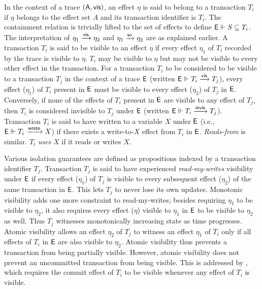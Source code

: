 In the context of a trace $(\textsf{A},\textsf{vis})$, an effect $\eta$ is said to
belong to a transaction $T_i$ if $\eta$ belongs to the effect set $A$
and its transaction identifier is $T_i$. The containment relation is
trivially lifted to the set of effects to define $\textsf{E} \Vdash S \subseteq
  T_i$.  The interpretation of $\eta_1 \xrightarrow{\textsf{vis}} \eta_2$ and $\eta_1
\xrightarrow{\textsf{so}} \eta_2$ are as explained earlier.  A transaction $T_i$ is said
to be visible to an effect $\eta$ if every effect $\eta_1$ of $T_i$
recorded by the trace is visible to $\eta$.  $T_i$ may be visible to
$\eta$ but may not be visible to every other effect in the
transaction. For a transaction $T_i$ to be considered to be visible to
a transaction $T_j$ in the context of a trace $\textsf{E}$ (written
$\textsf{E} \Vdash T_i \xrightarrow{\textsf{vis}} T_j$), every effect ($\eta_1$) of $T_i$ present
in $\textsf{E}$ must be visible to every effect ($\eta_2$) of $T_j$ in
$\textsf{E}$. Conversely, if none of the effects of $T_i$ present in $\textsf{E}$ are
visible to any effect of $T_j$, then $T_i$ is considered invisible to
$T_j$ under $\textsf{E}$ (written $\textsf{E} \Vdash T_i \xrightarrow{\textsf{invis}} T_j$). Transaction
$T_i$ is said to have written to a variable $X$ under $\textsf{E}$ (i.e.,
$\textsf{E} \Vdash T_i \xrightarrow{\textsf{wrsto}} X$) if there exists a write-to-$X$ effect from
$T_i$ in $\textsf{E}$. \emph{Reads-from} is similar. $T_i$ \emph{uses} $X$ if
it reads or writes $X$.

Various isolation guarantees are defined as propositions indexed by
a transaction identifier $T_j$. Transaction $T_j$ is said to have
experienced \emph{read-my-writes} visibility under $\textsf{E}$ if every
effect ($\eta_1$) of $T_j$ is visible to every subsequent effect
($\eta_2$) of the same transaction in $\textsf{E}$. This lets $T_j$ to never
lose its own updates. Monotonic visibility adds one more constraint to
read-my-writes; besides requiring $\eta_1$ to be visible to $\eta_2$,
it also requires every effect ($\eta$) visible to $\eta_1$ in $\textsf{E}$ to
be visible to $\eta_2$ as well. Thus $T_j$ witnesses monotonically
increasing state as time progresses. Atomic visibility allows an
effect $\eta_2$ of $T_j$ to witness an effect $\eta_1$ of $T_i$ only
if all effects of $T_i$ in $\textsf{E}$ are also visible to $\eta_2$. Atomic
visibility thus prevents a transaction from being partially visible.
However, atomic visibility does not prevent an uncommitted
transaction from being visible. This is addressed by ,
which requires the commit effect of $T_i$ to be visible whenever any
effect of $T_i$ is visible.

